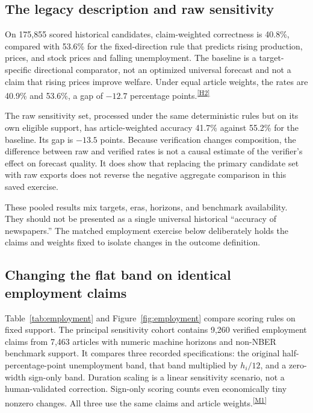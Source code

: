 \documentclass[iicol,pdflatex,sn-mathphys-num]{sn-jnl}
\newcommand{\evidence}[1]{\textsuperscript{\hyperref[app:evidence]{[#1]}}}
\begin{document}
\subsection{The legacy description and raw sensitivity}
On 175,855 scored historical candidates, claim-weighted correctness is 40.8\%, compared with 53.6\% for the fixed-direction rule that predicts rising production, prices, and stock prices and falling unemployment. The baseline is a target-specific directional comparator, not an optimized universal forecast and not a claim that rising prices improve welfare. Under equal article weights, the rates are 40.9\% and 53.6\%, a gap of $-12.7$ percentage points.\evidence{H2}

The raw sensitivity set, processed under the same deterministic rules but on its own eligible support, has article-weighted accuracy 41.7\% against 55.2\% for the baseline. Its gap is $-13.5$ points. Because verification changes composition, the difference between raw and verified rates is not a causal estimate of the verifier's effect on forecast quality. It does show that replacing the primary candidate set with raw exports does not reverse the negative aggregate comparison in this saved exercise.

These pooled results mix targets, eras, horizons, and benchmark availability. They should not be presented as a single universal historical ``accuracy of newspapers.'' The matched employment exercise below deliberately holds the claims and weights fixed to isolate changes in the outcome definition.

\subsection{Changing the flat band on identical employment claims}
Table~\ref{tab:employment} and Figure~\ref{fig:employment} compare scoring rules on fixed support. The principal sensitivity cohort contains 9,260 verified employment claims from 7,463 articles with numeric machine horizons and non-NBER benchmark support. It compares three recorded specifications: the original half-percentage-point unemployment band, that band multiplied by $h_i/12$, and a zero-width sign-only band. Duration scaling is a linear sensitivity scenario, not a human-validated correction. Sign-only scoring counts even economically tiny nonzero changes. All three use the same claims and article weights.\evidence{M1}
\end{document}
